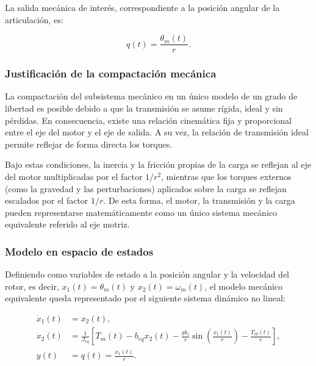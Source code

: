 \documentclass[10pt,a4paper]{article}
\begin{document}
La salida mecánica de interés, correspondiente a la posición angular de la articulación, es:

\begin{equation}
    q(t) = \frac{\theta_m(t)}{r}.
    \label{eq:salida_articulacion}
\end{equation}

\subsubsection{Justificación de la compactación mecánica}

La compactación del subsistema mecánico en un único modelo de un grado de libertad es posible debido a que la transmisión se asume rígida, ideal y sin pérdidas. 
En consecuencia, existe una relación cinemática fija y proporcional entre el eje del motor y el eje de salida. 
A su vez, la relación de transmisión ideal permite reflejar de forma directa los torques.

Bajo estas condiciones, la inercia y la fricción propias de la carga se reflejan al eje del motor multiplicadas por el factor $1/r^2$, 
mientras que los torques externos (como la gravedad y las perturbaciones) aplicados sobre la carga se reflejan escalados por el factor $1/r$. 
De esta forma, el motor, la transmisión y la carga pueden representarse matemáticamente como un único sistema mecánico equivalente referido al eje motriz.

\subsubsection{Modelo en espacio de estados}

Definiendo como variables de estado a la posición angular y la velocidad del rotor, es decir, 
$x_1(t)=\theta_m(t)$ y $x_2(t)=\omega_m(t)$, el modelo mecánico equivalente queda representado por el siguiente sistema dinámico no lineal:

\begin{equation}
    \boxed{
    \begin{aligned}
        \dot{x}_1(t) &= x_2(t), \\
        \dot{x}_2(t) &= \frac{1}{J_{eq}} \left[ T_m(t) - b_{eq}x_2(t) - \frac{g k_l}{r} \sin\left(\frac{x_1(t)}{r}\right) - \frac{T_{ld}(t)}{r} \right], \\
        y(t) &= q(t) = \frac{x_1(t)}{r}.
    \end{aligned}
    }
    \label{eq:ss_mecanico}
\end{equation}
\end{document}
